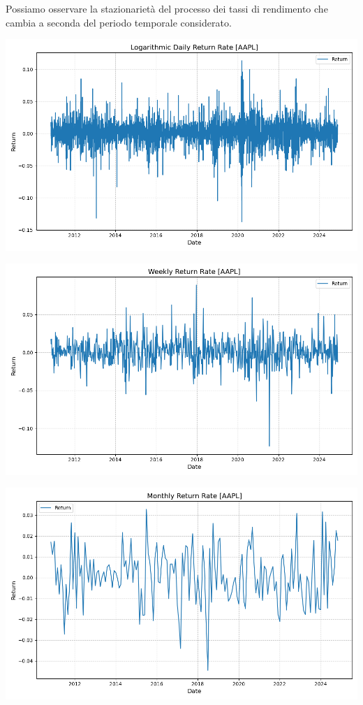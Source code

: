 \documentclass[compress]{beamer}
\begin{document}
\begin{frame}{\subsecname}
	Possiamo osservare la stazionarietà del processo dei tassi di rendimento che cambia a seconda del periodo temporale considerato. 
	\begin{minipage}{0.49\textwidth}
		\centering
		\includegraphics[width=0.8\linewidth]{images/Logarithmic Daily Return Rate [AAPL].png}
	\end{minipage}
	\hfill
	\begin{minipage}{0.49\textwidth}
		\centering
		\includegraphics[width=0.8\linewidth]{images/Weekly Return Rate [AAPL].png}
	\end{minipage}
	\vspace{-0.5cm}
	\begin{center}
		\begin{minipage}{0.5\textwidth}
			\centering
			\includegraphics[width=0.8\linewidth]{images/Monthly Return Rate [AAPL].png}
		\end{minipage}
	\end{center}
\end{frame}
\end{document}

